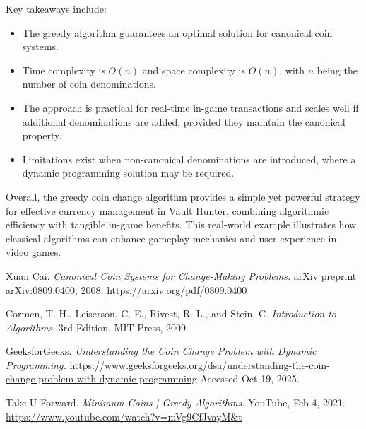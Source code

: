 \documentclass[12pt,a4paper]{report}
\begin{document}
Key takeaways include:

\begin{itemize}
    \item The greedy algorithm guarantees an optimal solution for canonical coin systems.  
    \item Time complexity is $O(n)$ and space complexity is $O(n)$, with $n$ being the number of coin denominations.  
    \item The approach is practical for real-time in-game transactions and scales well if additional denominations are added, provided they maintain the canonical property.  
    \item Limitations exist when non-canonical denominations are introduced, where a dynamic programming solution may be required.  
\end{itemize}

Overall, the greedy coin change algorithm provides a simple yet powerful strategy for effective currency management in Vault Hunter, combining algorithmic efficiency with tangible in-game benefits. This real-world example illustrates how classical algorithms can enhance gameplay mechanics and user experience in video games.


\begin{thebibliography}{99}

Xuan Cai.  
\textit{Canonical Coin Systems for Change-Making Problems.} arXiv preprint arXiv:0809.0400, 2008.  
\url{https://arxiv.org/pdf/0809.0400}

Cormen, T. H., Leiserson, C. E., Rivest, R. L., and Stein, C.  
\textit{Introduction to Algorithms}, 3rd Edition.  
MIT Press, 2009.

GeeksforGeeks.  
\textit{Understanding the Coin Change Problem with Dynamic Programming.}  
\url{https://www.geeksforgeeks.org/dsa/understanding-the-coin-change-problem-with-dynamic-programming}  
Accessed Oct 19, 2025.

Take U Forward.  
\textit{Minimum Coins | Greedy Algorithms.} YouTube, Feb 4, 2021.  
\url{https://www.youtube.com/watch?v=mVg9CfJvayM&t}

\end{thebibliography}
\end{document}
